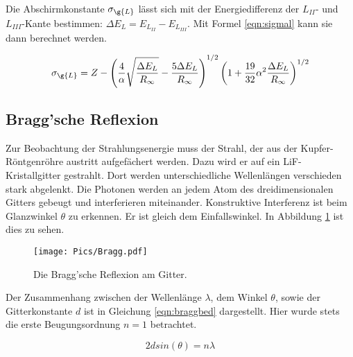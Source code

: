 Die Abschirmkonstante $\sigma_{\g{L}}$ lässt sich mit der Energiedifferenz der $L_{II}$-
und $L_{III}$-Kante bestimmen: $\Delta E_{L} = E_{L_{II}} - E_{L_{III}}$.
Mit Formel \eqref{eqn:sigmal} kann sie dann berechnet werden.

\begin{equation}
  \sigma_{\g{L}} = Z - \left(\frac{4}{\alpha} \sqrt{\frac{\Delta E_{L}}{R_{\infty}}} -
  \frac{5 \Delta E_{L}}{R_{\infty}} \right)^{1/2} \left(1 + \frac{19}{32} \alpha^2 \frac{\Delta E_{L}}{R_{\infty}} \right)^{1/2}
  \label{eqn:sigmal}
\end{equation}

\subsection{Bragg'sche Reflexion}

Zur Beobachtung der Strahlungsenergie muss der Strahl, der aus der Kupfer-Röntgenröhre
austritt aufgefächert werden. Dazu wird er auf ein LiF-Kristallgitter gestrahlt. Dort
werden unterschiedliche Wellenlängen verschieden stark abgelenkt. Die Photonen werden
an jedem Atom des dreidimensionalen Gitters gebeugt und interferieren miteinander.
Konstruktive Interferenz ist beim Glanzwinkel $\theta$ zu erkennen. Er ist gleich
dem Einfallswinkel. In Abbildung \ref{fig:bragg} ist dies zu sehen.

\begin{figure}
  \centering
  \texttt{[image: Pics/Bragg.pdf]}
  \caption{Die Bragg'sche Reflexion am Gitter. \cite{anleitung}}
  \label{fig:bragg}
\end{figure}

Der Zusammenhang zwischen der Wellenlänge $\lambda$, dem Winkel $\theta$, sowie der
Gitterkonstante $d$ ist in Gleichung \eqref{eqn:braggbed} dargestellt. Hier wurde
stets die erste Beugungsordnung $n=1$ betrachtet.

\begin{equation}
  2 d sin(\theta) = n \lambda
  \label{eqn:braggbed}
\end{equation}
